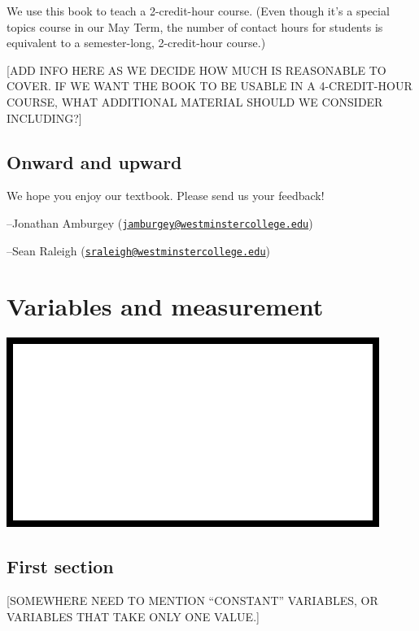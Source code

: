 \documentclass[
]{book}
\begin{document}
We use this book to teach a 2-credit-hour course. (Even though it's a special topics course in our May Term, the number of contact hours for students is equivalent to a semester-long, 2-credit-hour course.)

{[}ADD INFO HERE AS WE DECIDE HOW MUCH IS REASONABLE TO COVER. IF WE WANT THE BOOK TO BE USABLE IN A 4-CREDIT-HOUR COURSE, WHAT ADDITIONAL MATERIAL SHOULD WE CONSIDER INCLUDING?{]}

\hypertarget{intro-onward}{%
\section*{Onward and upward}\label{intro-onward}}

We hope you enjoy our textbook. Please send us your feedback!

--Jonathan Amburgey (\href{mailto:jamburgey@westminstercollege.edu}{\nolinkurl{jamburgey@westminstercollege.edu}})

--Sean Raleigh (\href{mailto:sraleigh@westminstercollege.edu}{\nolinkurl{sraleigh@westminstercollege.edu}})

\hypertarget{variables}{%
\chapter{Variables and measurement}\label{variables}}

\begin{center}\includegraphics{graphics/variable} \end{center}

\hypertarget{variables-first-section}{%
\section{First section}\label{variables-first-section}}

{[}SOMEWHERE NEED TO MENTION ``CONSTANT'' VARIABLES, OR VARIABLES THAT TAKE ONLY ONE VALUE.{]}
\end{document}
